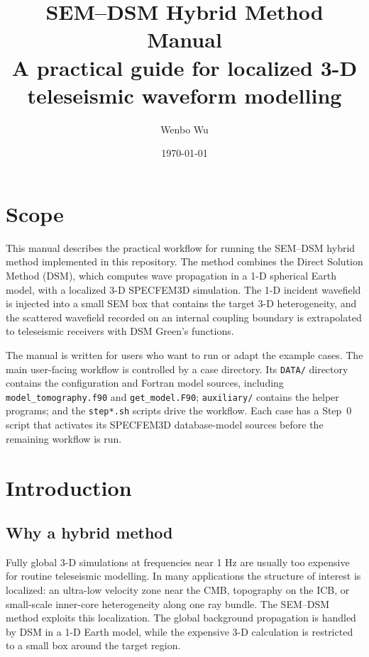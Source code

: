 \documentclass[11pt,oneside]{book}
\title{\textbf{SEM--DSM Hybrid Method Manual}\\
\large A practical guide for localized 3-D teleseismic waveform modelling}
\author{Wenbo Wu}
\date{\today}
\newcommand{\semdsm}{SEM--DSM}
\newcommand{\specfem}{SPECFEM3D}
\DeclareRobustCommand{\code}[1]{\nolinkurl{#1}}
\begin{document}
\frontmatter
\maketitle
\tableofcontents

\chapter*{Scope}

This manual describes the practical workflow for running the \semdsm{}
hybrid method implemented in this repository. The method combines the Direct
Solution Method (DSM), which computes wave propagation in a 1-D spherical
Earth model, with a localized 3-D \specfem{} simulation. The 1-D incident
wavefield is injected into a small SEM box that contains the target 3-D
heterogeneity, and the scattered wavefield recorded on an internal coupling
boundary is extrapolated to teleseismic receivers with DSM Green's functions.

The manual is written for users who want to run or adapt the example cases.
The main user-facing workflow is controlled by a case directory. Its
\code{DATA/} directory contains the configuration and Fortran model sources,
including \code{model_tomography.f90} and \code{get_model.F90};
\code{auxiliary/} contains the helper programs; and the \code{step*.sh}
scripts drive the workflow. Each case has a Step~0 script that activates its
SPECFEM3D database-model sources before the remaining workflow is run.

\mainmatter

\chapter{Introduction}

\section{Why a hybrid method}

Fully global 3-D simulations at frequencies near 1 Hz are usually too
expensive for routine teleseismic modelling. In many applications the
structure of interest is localized: an ultra-low velocity zone near the CMB,
topography on the ICB, or small-scale inner-core heterogeneity along one
ray bundle. The \semdsm{} method exploits this localization. The global
background propagation is handled by DSM in a 1-D Earth model, while the
expensive 3-D calculation is restricted to a small box around the target
region.
\end{document}
